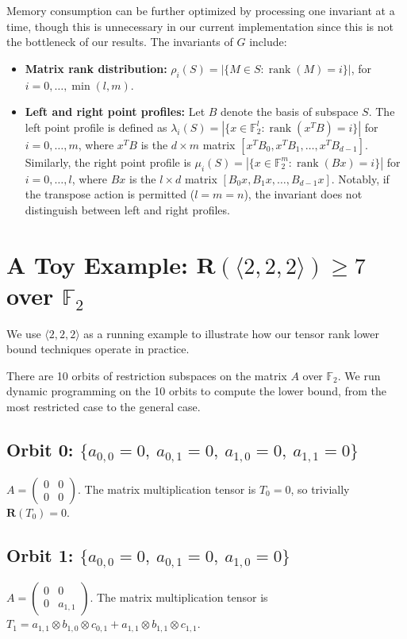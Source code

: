 \documentclass[11pt]{article}
\begin{document}
Memory consumption can be further optimized by processing one invariant at a time, though this is unnecessary in our current implementation since this is not the bottleneck of our results. The invariants of $G$ include:
\begin{itemize}
  \item \textbf{Matrix rank distribution:} $\rho_i(S)=|\{M\in S: \operatorname{rank}(M)=i\}|$, for $i=0,\ldots,\operatorname{min}(l,m)$.
  \item \textbf{Left and right point profiles:} Let $B$ denote the basis of subspace $S$. The left point profile is defined as $\lambda_i(S) = | \{ x\in \mathbb{F}_2^{l} : \operatorname{rank}(x^T B) = i \}|$ for $i=0,\ldots,m$, where $x^T B$ is the $d\times m$ matrix $[x^T  B_0, x^T  B_1, \ldots, x^T  B_{d-1}]$. Similarly, the right point profile is $\mu_i(S) = | \{ x\in \mathbb{F}_2^{m} : \operatorname{rank}(Bx) = i \}|$ for $i=0,\ldots,l$, where $Bx$ is the $l\times d$ matrix $[B_0 x, B_1 x, \ldots, B_{d-1} x]$. Notably, if the transpose action is permitted ($l=m=n$), the invariant does not distinguish between left and right profiles.
\end{itemize}

\section{A Toy Example: $\mathbf{R}(\langle 2,2,2\rangle)\ge 7$ over $\mathbb{F}_2$}\label{sec:toy-example}

We use $\langle 2,2,2\rangle$ as a running example to illustrate how our tensor rank lower bound techniques operate in practice.

There are 10 orbits of restriction subspaces on the matrix $A$ over $\mathbb{F}_2$. We run dynamic programming on the 10 orbits to compute the lower bound, from the most restricted case to the general case.

\subsection*{Orbit 0: $\{a_{0,0}=0,\ a_{0,1}=0,\ a_{1,0}=0,\ a_{1,1}=0\}$}
$A=\begin{pmatrix}
    0 & 0 \\
    0 & 0
  \end{pmatrix}$.
The matrix multiplication tensor is $T_0=0$, so trivially $\mathbf{R} (T_0) = 0$.

\subsection*{Orbit 1: $\{a_{0,0}=0,\ a_{0,1}=0,\ a_{1,0}=0\}$}
$A=\begin{pmatrix}
    0 & 0       \\
    0 & a_{1,1}
  \end{pmatrix}$.
The matrix multiplication tensor is $T_1 = a_{1,1} \otimes b_{1,0} \otimes c_{0,1} + a_{1,1} \otimes b_{1,1} \otimes c_{1,1}$.
\end{document}
